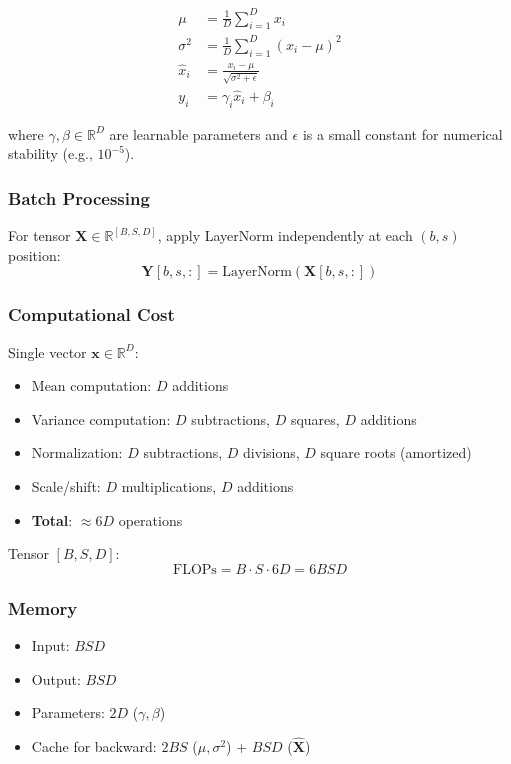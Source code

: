 \documentclass[10pt]{article}
\begin{document}
\begin{align}
\mu &= \frac{1}{D} \sum_{i=1}^{D} x_i \\
\sigma^2 &= \frac{1}{D} \sum_{i=1}^{D} (x_i - \mu)^2 \\
\hat{x}_i &= \frac{x_i - \mu}{\sqrt{\sigma^2 + \epsilon}} \\
y_i &= \gamma_i \hat{x}_i + \beta_i
\end{align}

where $\gamma, \beta \in \mathbb{R}^{D}$ are learnable parameters and $\epsilon$ is a small constant for numerical stability (e.g., $10^{-5}$).

\subsubsection{Batch Processing}

For tensor $\mathbf{X} \in \mathbb{R}^{[B,S,D]}$, apply LayerNorm independently at each $(b,s)$ position:
\begin{equation}
\mathbf{Y}[b,s,:] = \text{LayerNorm}(\mathbf{X}[b,s,:])
\end{equation}

\subsubsection{Computational Cost}

Single vector $\mathbf{x} \in \mathbb{R}^{D}$:
\begin{itemize}
  \item Mean computation: $D$ additions
  \item Variance computation: $D$ subtractions, $D$ squares, $D$ additions
  \item Normalization: $D$ subtractions, $D$ divisions, $D$ square roots (amortized)
  \item Scale/shift: $D$ multiplications, $D$ additions
  \item \textbf{Total}: $\approx 6D$ operations
\end{itemize}

Tensor $[B,S,D]$:
\begin{equation}
\text{FLOPs} = B \cdot S \cdot 6D = 6BSD
\end{equation}

\subsubsection{Memory}

\begin{itemize}
  \item Input: $BSD$
  \item Output: $BSD$
  \item Parameters: $2D$ ($\gamma, \beta$)
  \item Cache for backward: $2BS$ ($\mu, \sigma^2$) + $BSD$ ($\hat{\mathbf{X}}$)
\end{itemize}
\end{document}
